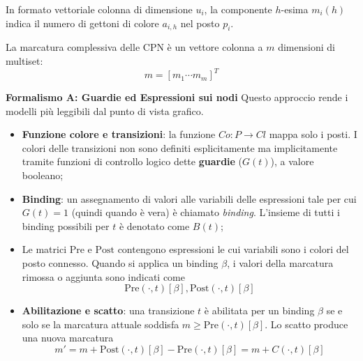 In formato vettoriale colonna di dimensione $u_i$, la componente $h$-esima $m_i(h)$ indica il numero di gettoni di colore $a_{i,h}$ nel posto $p_i$.

La marcatura complessiva delle CPN è un vettore colonna a $m$ dimensioni di multiset:
\begin{equation}
	m = [m_1 \cdots m_m]^T
\end{equation}

\noindent \textbf{Formalismo A: Guardie ed Espressioni sui nodi}
Questo approccio rende i modelli più leggibili dal punto di vista grafico.

\begin{itemize}
	\item \textbf{Funzione colore e transizioni}: la funzione $Co: P \rightarrow Cl$ mappa solo i posti. I colori delle transizioni non sono definiti esplicitamente ma implicitamente tramite funzioni di controllo logico dette \textbf{guardie} ($G(t)$), a valore booleano;
	\item \textbf{Binding}: un assegnamento di valori alle variabili delle espressioni tale per cui $G(t) = 1$ (quindi quando è vera) è chiamato \textit{binding}. L'insieme di tutti i binding possibili per $t$ è denotato come $B(t)$;
	\item Le matrici $\text{Pre}$ e $\text{Post}$ contengono espressioni le cui variabili sono i colori del posto connesso. Quando si applica un binding $\beta$, i valori della marcatura rimossa o aggiunta sono indicati come
	\begin{equation}
		\text{Pre}(\cdot, t)[\beta],
		\text{Post}(\cdot, t)[\beta]
	\end{equation}
	\item \textbf{Abilitazione e scatto}: una transizione $t$ è abilitata per un binding $\beta$ se e solo se la marcatura attuale soddisfa $m \ge \text{Pre}(\cdot, t)[\beta]$. Lo scatto produce una nuova marcatura
	\begin{equation}
		m' = m + \text{Post}(\cdot, t)[\beta] - \text{Pre}(\cdot, t)[\beta] = m + C(\cdot, t)[\beta]
	\end{equation}
\end{itemize}

